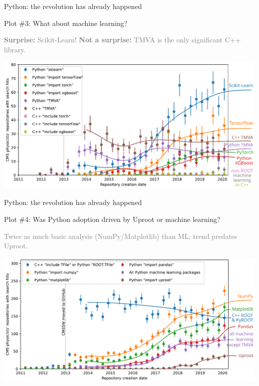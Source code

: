 \documentclass[aspectratio=169]{beamer}
\begin{document}
\begin{frame}{Python: the revolution has already happened}
\large
\vspace{0.35 cm}

Plot \#3: What about machine learning?

\normalsize
\textcolor{gray}{{\bf Surprise:} Scikit-Learn! {\bf Not a surprise:} TMVA is the only significant C++ library.}

\begin{center}
\includegraphics[width=0.85\linewidth]{img/04-github-machine-learning.pdf}
\end{center}
\end{frame}

\begin{frame}{Python: the revolution has already happened}
\large
\vspace{0.35 cm}

Plot \#4: Was Python adoption driven by Uproot or machine learning?

\normalsize
\textcolor{gray}{Twice as much basic analysis (NumPy/Matplotlib) than ML; trend predates Uproot.}

\begin{center}
\includegraphics[width=0.85\linewidth]{img/05-github-anyroot-python-machinelearning-uproot.pdf}
\end{center}
\end{frame}
\end{document}
